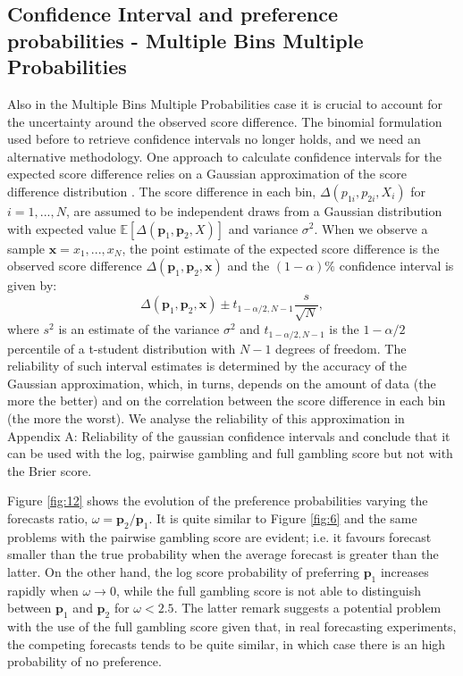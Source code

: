 \documentclass[referee,sn-basic]{sn-jnl}
\theoremstyle{thmstyleone}%
\theoremstyle{thmstyletwo}%
\theoremstyle{thmstylethree}%
\begin{document}
\subsection{ Confidence Interval and preference probabilities -  Multiple Bins Multiple Probabilities }

Also in the Multiple Bins Multiple Probabilities case it is crucial to account for the uncertainty around the observed score difference. The binomial formulation used before to retrieve confidence intervals no longer holds, and we need an alternative methodology. One approach to calculate confidence intervals for the expected score difference relies on a Gaussian approximation of the score difference distribution \citep{rhoades2011efficient}. The score difference in each bin, $\Delta(p_{1i}, p_{2i}, X_i)$ for $i = 1,...,N$, are assumed to be independent draws from a Gaussian distribution with expected value $\mathbb E[\Delta(\mathbf p_1, \mathbf p_2, X)]$ and variance $\sigma^2$. When we observe a sample $\mathbf x = x_1,...,x_N$, the point estimate of the expected score difference is the observed score difference $\Delta(\mathbf p_1, \mathbf p_2, \mathbf x)$ and the $(1-\alpha)\%$ confidence interval is given by:
$$
\Delta(\mathbf p_1, \mathbf p_2, \mathbf x) \pm t_{1-\alpha/2, N-1}\frac{s}{\sqrt N},
$$
where $s^2$ is an estimate of the variance $\sigma^2$ and $t_{1-\alpha/2, N-1}$ is the $1-\alpha/2$ percentile of a t-student distribution with $N - 1$ degrees of freedom. The reliability of such interval estimates is determined by the accuracy of the Gaussian approximation, which, in turns, depends on the amount of data (the more the better) and on the correlation between the score difference in each bin (the more the worst). We analyse the reliability of this approximation in Appendix A: Reliability of the gaussian confidence intervals and conclude that it can be used with the log, pairwise gambling and full gambling score but not with the Brier score. 

Figure \ref{fig:12} shows the evolution of the preference probabilities varying the forecasts ratio, $\omega = \mathbf p_2/\mathbf p_1$. It is quite similar to Figure \ref{fig:6} and the same problems with the pairwise gambling score are evident; i.e. it favours forecast smaller than the true probability when the average forecast is greater than the latter. On the other hand, the log score probability of preferring $\mathbf p_1$ increases rapidly when $\omega \rightarrow 0$, while the full gambling score is not able to distinguish between $\mathbf p_1$ and $\mathbf p_2$ for $\omega < 2.5$. The latter remark suggests a potential problem with the use of the full gambling score given that, in real forecasting experiments, the competing forecasts tends to be quite similar, in which case there is an high probability of no preference.  
\end{document}
